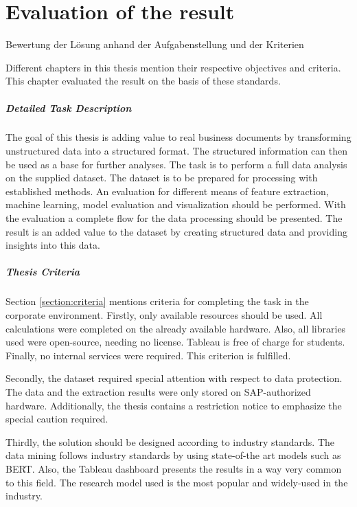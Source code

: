 \chapter{Evaluation of the result}
Bewertung der Lösung anhand der Aufgabenstellung und der Kriterien

Different chapters in this thesis mention their respective objectives and criteria. This chapter evaluated the result on the basis of these standards.

\paragraph{Detailed Task Description}
The goal of this thesis is adding value to real business documents by transforming unstructured data into a structured format. The structured information can then be used as a base for further analyses.
The task is to perform a full data analysis on the supplied dataset. The dataset is to be prepared for processing with established methods. An evaluation for different means of feature extraction, machine learning, model evaluation and visualization should be performed. With the evaluation a complete flow for the data processing should be presented. The result is an added value to the dataset by creating structured data and providing insights into this data.


\paragraph{Thesis Criteria}
Section \ref{section:criteria} mentions criteria for completing the task in the corporate environment. Firstly, only available resources should be used. All calculations were completed on the already available hardware. Also, all libraries used were open-source, needing no license. Tableau is free of charge for students. Finally, no internal services were required. This criterion is fulfilled.

Secondly, the dataset required special attention with respect to data protection. The data and the extraction results were only stored on SAP-authorized hardware. Additionally, the thesis contains a restriction notice to emphasize the special caution required.

Thirdly, the solution should be designed according to industry standards. The data mining follows industry standards by using state-of-the art models such as \ac{BERT}. Also, the Tableau dashboard presents the results in a way very common to this field. The research model used is the most popular and widely-used in the industry.

